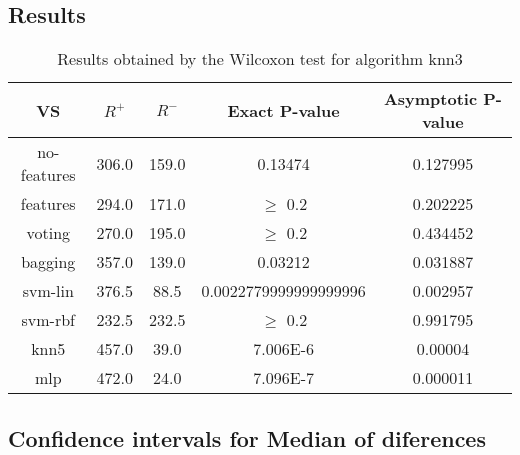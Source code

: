 \documentclass[a4paper,10pt]{article}
\begin{document}
\subsection{Results}

\begin{table}[!htp]
\centering\small
\begin{tabular}{
|c|c|c|c|c|}
\hline
 VS & $R^{+}$ & $R^{-}$ & Exact P-value & Asymptotic P-value \\ \hline 
no-features & 306.0 & 159.0 & 0.13474 & 0.127995\\ \hline 
features & 294.0 & 171.0 & $\geq$ 0.2 & 0.202225\\ \hline 
voting & 270.0 & 195.0 & $\geq$ 0.2 & 0.434452\\ \hline 
bagging & 357.0 & 139.0 & 0.03212 & 0.031887\\ \hline 
svm-lin & 376.5 & 88.5 & 0.0022779999999999996 & 0.002957\\ \hline 
svm-rbf & 232.5 & 232.5 & $\geq$ 0.2 & 0.991795\\ \hline 
knn5 & 457.0 & 39.0 & 7.006E-6 & 0.00004\\ \hline 
mlp & 472.0 & 24.0 & 7.096E-7 & 0.000011\\ \hline 

\end{tabular}
\caption{Results obtained by the Wilcoxon test for algorithm knn3}
\end{table}

\subsection{Confidence intervals for Median of diferences}
\end{document}
